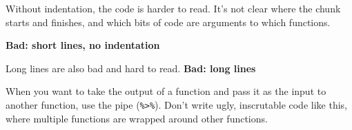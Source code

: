 \documentclass[]{book}
\newenvironment{Shaded}{\begin{snugshade}}{\end{snugshade}}
\newcommand{\DataTypeTok}[1]{\textcolor[rgb]{0.13,0.29,0.53}{#1}}
\newcommand{\DecValTok}[1]{\textcolor[rgb]{0.00,0.00,0.81}{#1}}
\newcommand{\KeywordTok}[1]{\textcolor[rgb]{0.13,0.29,0.53}{\textbf{#1}}}
\newcommand{\NormalTok}[1]{#1}
\newcommand{\OperatorTok}[1]{\textcolor[rgb]{0.81,0.36,0.00}{\textbf{#1}}}
\newcommand{\OtherTok}[1]{\textcolor[rgb]{0.56,0.35,0.01}{#1}}
\newcommand{\StringTok}[1]{\textcolor[rgb]{0.31,0.60,0.02}{#1}}
\begin{document}
Without indentation, the code is harder to read. It's not clear where the chunk starts and finishes, and which bits of code are arguments to which functions.

\textbf{Bad: short lines, no indentation}

\begin{Shaded}
\end{Shaded}

Long lines are also bad and hard to read.
\textbf{Bad: long lines}

\begin{Shaded}
\end{Shaded}

When you want to take the output of a function and pass it as the input to another function, use the pipe (\texttt{\%\textgreater{}\%}). Don't write ugly, inscrutable code like this, where multiple functions are wrapped around other functions.
\end{document}

